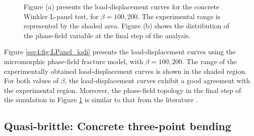 \documentclass[11pt]{article}
\begin{document}
\begin{figure}[!ht]
  \begin{subfigure}[t]{0.45\textwidth}
  \centering
    \caption{ }
    \label{sec4:fig:pf_LPanel_failure}
  \end{subfigure}
  \caption{Figure (a) presents the load-displacement curves for the concrete Winkler L-panel test, for $\beta = 100, 200$. The experimental range is represented by the shaded area. Figure (b) shows the distribution of the phase-field variable at the final step of the analysis.}
  \label{sec4:fig:LPanel_results}
\end{figure}

Figure \ref{sec4:fig:LPanel_lodi} presents the load-displacement curves using the micromorphic phase-field fracture model, with $\beta = 100,200$. The range of the experimentally obtained load-displacement curves is shown in the shaded region. For both values of $\beta$, the load-displacement curves exhibit a good agreement with the experimental region. Moreover, the phase-field topology in the final step of the simulation in Figure \ref{sec4:fig:pf_LPanel_failure} is similar to that from the literature \cite{winkler2001traglastuntersuchungen}.


\subsection{Quasi-brittle: Concrete three-point bending}\label{sec4:concreteTPB}
\end{document}
